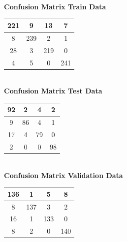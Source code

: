 \documentclass{article}
\begin{document}
\begin{flushleft}
\textbf{Confusion Matrix Train Data\\[5pt]}
\begin{tabular}{|c|c|c|c|}
\hline
221 & 9 & 13 & 7 \\
\hline
8 & 239 & 2 & 1 \\
\hline
28 & 3 & 219 & 0 \\
\hline
4 & 5 & 0 & 241 \\
\hline
\end{tabular}
\textbf{\\[10pt] Confusion Matrix Test Data \\[5pt]}
\begin{tabular}{|c|c|c|c|}
\hline
92 & 2 & 4 & 2 \\
\hline
9 & 86 & 4 & 1 \\
\hline
17 & 4 & 79 & 0 \\
\hline
2 & 0 & 0 & 98 \\
\hline
\end{tabular}
\textbf{\\[10pt] Confusion Matrix Validation Data \\[5pt]}
\begin{tabular}{|c|c|c|c|}
\hline
136 & 1 & 5 & 8 \\
\hline
8 & 137 & 3 & 2 \\
\hline
16 & 1 & 133 & 0 \\
\hline
8 & 2 & 0 & 140 \\
\hline
\end{tabular}
\end{flushleft}
\end{document}
